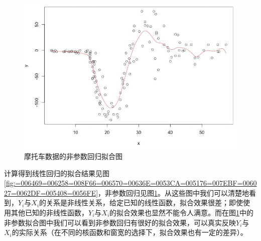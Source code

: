 \documentclass[12pt,a4paper,openany,twoside]{book}
\numberwithin{figure}{chapter}
\numberwithin{table}{chapter}
\numberwithin{equation}{chapter}
\begin{document}
\begin{figure}[H]
\begin{centering}
\includegraphics[width=14cm]{figure/mcycleloc}
\par\end{centering}

\caption{摩托车数据的非参数回归拟合图\label{fig:=006469=006258=008F66=006570=00636E=007684=00975E=0053C2=006570=0056DE=005F52=0062DF=005408=0056FE}}
\end{figure}


计算得到线性回归的拟合结果见图\ref{fig:=006469=006258=008F66=006570=00636E=0053CA=005176=007EBF=006027=0062DF=005408=0056FE}，非参数回归见图\ref{fig:=006469=006258=008F66=006570=00636E=007684=00975E=0053C2=006570=0056DE=005F52=0062DF=005408=0056FE}。从这些图中我们可以清楚地看到，$Y_{i}$与$X_{i}$的关系是非线性关系，$ $给定已知的线性函数，拟合效果很差；即使使用其他已知的非线性函数，$Y_{i}$与$X_{i}$的拟合效果也显然不能令人满意。而在图\ref{fig:=006469=006258=008F66=006570=00636E=007684=00975E=0053C2=006570=0056DE=005F52=0062DF=005408=0056FE}中的非参数拟合图中我们可以看到非参数回归有很好的拟合效果，可以真实反映$Y_{i}$与$X_{i}$的实际关系（在不同的核函数和窗宽的选择下，拟合效果也有一定的差异）。$ $

\newpage{}

\setlength{\bibsep}{0.5ex}  %
\nocite{*}  %


\end{document}
